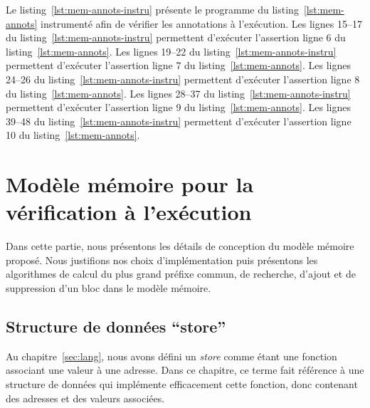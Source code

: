 Le listing~\ref{lst:mem-annots-instru} présente le programme du
listing~\ref{lst:mem-annots} instrumenté afin de vérifier les annotations à
l'exécution.
Les lignes 15--17 du listing~\ref{lst:mem-annots-instru} permettent d'exécuter
l'assertion ligne 6 du listing~\ref{lst:mem-annots}.
Les lignes 19--22 du listing~\ref{lst:mem-annots-instru} permettent d'exécuter
l'assertion ligne 7 du listing~\ref{lst:mem-annots}.
Les lignes 24--26 du listing~\ref{lst:mem-annots-instru} permettent d'exécuter
l'assertion ligne 8 du listing~\ref{lst:mem-annots}.
Les lignes 28--37 du listing~\ref{lst:mem-annots-instru} permettent d'exécuter
l'assertion ligne 9 du listing~\ref{lst:mem-annots}.
Les lignes 39--48 du listing~\ref{lst:mem-annots-instru} permettent d'exécuter
l'assertion ligne 10 du listing~\ref{lst:mem-annots}.


\section{Modèle mémoire pour la vérification à l'exécution}
\label{sec:mem-model}


Dans cette partie, nous présentons les détails de conception du modèle mémoire
proposé.
Nous justifions nos choix d'implémentation puis présentons les algorithmes de
calcul du plus grand préfixe commun, de recherche, d'ajout et de suppression
d'un bloc dans le modèle mémoire.


\subsection{Structure de données ``store''}


Au chapitre~\ref{sec:lang}, nous avons défini un {\em store} comme étant une
fonction associant une valeur à une adresse.
Dans ce chapitre, ce terme fait référence à une structure de données qui
implémente efficacement cette fonction, donc contenant des adresses et des
valeurs associées.

